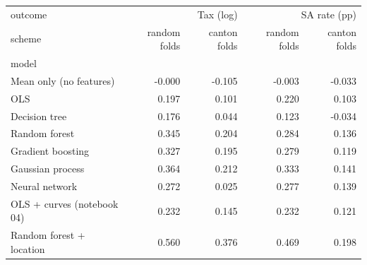 \begin{tabular}{lrrrr}
\toprule
outcome & \multicolumn{2}{r}{Tax (log)} & \multicolumn{2}{r}{SA rate (pp)} \\
scheme & random folds & canton folds & random folds & canton folds \\
model &  &  &  &  \\
\midrule
Mean only (no features) & -0.000 & -0.105 & -0.003 & -0.033 \\
OLS & 0.197 & 0.101 & 0.220 & 0.103 \\
Decision tree & 0.176 & 0.044 & 0.123 & -0.034 \\
Random forest & 0.345 & 0.204 & 0.284 & 0.136 \\
Gradient boosting & 0.327 & 0.195 & 0.279 & 0.119 \\
Gaussian process & 0.364 & 0.212 & 0.333 & 0.141 \\
Neural network & 0.272 & 0.025 & 0.277 & 0.139 \\
OLS + curves (notebook 04) & 0.232 & 0.145 & 0.232 & 0.121 \\
Random forest + location & 0.560 & 0.376 & 0.469 & 0.198 \\
\bottomrule
\end{tabular}

